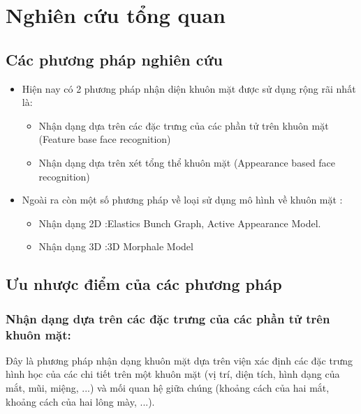\chapter{Nghiên cứu tổng quan}
\label{cha:chap1}

\section{Các phương pháp nghiên cứu}

\begin{itemize}
    \item Hiện nay có 2 phương pháp nhận diện khuôn mặt được sử dụng rộng rãi nhất là:
          \begin{itemize}
              \item Nhận dạng dựa trên các đặc trưng của các phần tử trên khuôn mặt
                    (Feature base face recognition)
              \item Nhận dạng dựa trên xét tổng thể khuôn mặt (Appearance based face
                    recognition)
          \end{itemize}

    \item Ngoài ra còn một số phương pháp về loại sử dụng mô hình về khuôn mặt :
          \begin{itemize}
              \item Nhận dạng 2D :Elastics Bunch Graph, Active Appearance Model.
              \item Nhận dạng 3D :3D Morphale Model
          \end{itemize}
\end{itemize}

\section{Ưu nhược điểm của các phương pháp}
\subsection{Nhận dạng dựa trên các đặc trưng của các phần tử trên khuôn mặt: }

Đây là phương pháp nhận dạng khuôn mặt dựa trên viện xác định các đặc trưng hình
học của các chi tiết trên một khuôn mặt (vị trí, diện tích, hình dạng của mắt,
mũi, miệng, ...) và mối quan hệ giữa chúng (khoảng cách của hai mắt, khoảng cách
của hai lông mày, ...).

